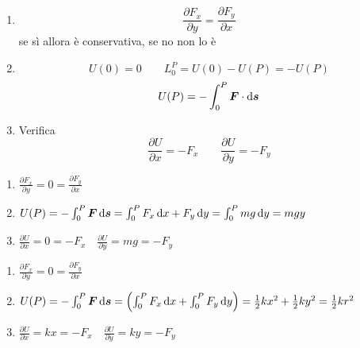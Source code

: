 \begin{enumerate}
\item
\[\frac {\partial F_x}{\partial y}=\frac {\partial
F_y}{\partial x}
\]
 se sì allora è conservativa, se no non lo è

\item\begin{equation*}U(0)=0 \qquad L_0^P=U(0)-U(P)=-U(P)\end{equation*}
\begin{equation*}U(P)=-\int_0^P \boldsymbol{F}\cdot\mathrm{d} \boldsymbol{s}\end{equation*}

\item Verifica
\begin{equation*}\frac {\partial U}{\partial x}=-F_x \qquad \frac{\partial U}{\partial y}=-F_y\end{equation*}
\end{enumerate}
\begin{Es}[Forza peso $F_x=0 \quad F_y=mg$]
\begin{enumerate}
\item $\frac {\partial F_x}{\partial y}=0=\frac {\partial
F_y}{\partial x}$

\item $U(P)=-\int_0^P  \boldsymbol{F}\, \mathrm{d} \boldsymbol{s}=\int_0^P F_x\, \mathrm{d} x+F_y\, \mathrm{d}
y=\int_0^P mg \, \mathrm{d} y = mgy$

\item $\frac {\partial U}{\partial x}=0=-F_x\quad \frac {\partial
U}{\partial y}=mg=-F_y$
\end{enumerate}
\end{Es}
\begin{Es}[Forza elastica $F_x=-kx \quad F_y=-ky$]
\begin{enumerate}
\item$\frac {\partial F_x}{\partial y}=0=\frac {\partial
F_y}{\partial x}$

\item$U(P)=-\int_0^P \boldsymbol{F}\, \mathrm{d} \boldsymbol{s}=\left(\int_0^P F_x\, \mathrm{d} x+\int_0^P
F_y\, \mathrm{d} y \right)=\frac
{1}{2}kx^2+\frac{1}{2}ky^2=\frac{1}{2}kr^2$

\item$\frac{\partial U}{\partial x}=kx=-F_x \quad \frac{\partial
U}{\partial y}=ky=-F_y$
\end{enumerate}
\end{Es}
